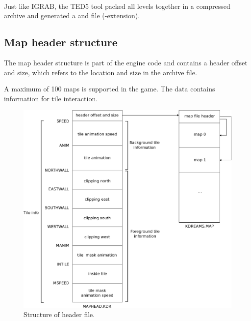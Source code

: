 \documentclass[book.tex]{subfiles}
\begin{document}
 \par
{}\\
 
 \par

Just like IGRAB, the TED5 tool packed all levels together in a compressed  archive and generated a  and  file (-extension). \\
 
\subsection{Map header structure}
The map header structure is part of the engine code and contains a header offset and size, which refers to the location and size in the  archive file. \\

\par
\begin{minipage}{\textwidth}
 \par
 \end{minipage}

A maximum of 100 maps is supported in the game. The  data contains information for tile interaction. 


 
\begin{figure}[H]
\centering
 \includegraphics[width=1.0\textwidth]{imgs/drawings/map_header.eps}
 \caption{Structure of  header file.}
 \label{fig:map-header-file}
\end{figure}
\par
\end{document}
